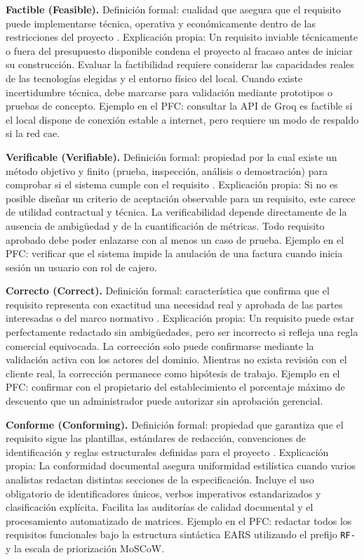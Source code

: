 \documentclass[onecolumn,12pt,a4paper]{IEEEtran}
\begin{document}
	\textbf{Factible (Feasible).} Definici\'on formal: cualidad que asegura que el requisito puede implementarse t\'ecnica, operativa y econ\'omicamente dentro de las restricciones del proyecto \cite{iso29148,ireb2023}. Explicaci\'on propia: Un requisito inviable t\'ecnicamente o fuera del presupuesto disponible condena el proyecto al fracaso antes de iniciar su construcci\'on. Evaluar la factibilidad requiere considerar las capacidades reales de las tecnolog\'ias elegidas y el entorno f\'isico del local. Cuando existe incertidumbre t\'ecnica, debe marcarse para validaci\'on mediante prototipos o pruebas de concepto. Ejemplo en el PFC: consultar la API de Groq es factible si el local dispone de conexi\'on estable a internet, pero requiere un modo de respaldo si la red cae.

	\textbf{Verificable (Verifiable).} Definici\'on formal: propiedad por la cual existe un m\'etodo objetivo y finito (prueba, inspecci\'on, an\'alisis o demostraci\'on) para comprobar si el sistema cumple con el requisito \cite{iso29148,pohl2025,swebok4}. Explicaci\'on propia: Si no es posible dise\~nar un criterio de aceptaci\'on observable para un requisito, este carece de utilidad contractual y t\'ecnica. La verificabilidad depende directamente de la ausencia de ambig\"uedad y de la cuantificaci\'on de m\'etricas. Todo requisito aprobado debe poder enlazarse con al menos un caso de prueba. Ejemplo en el PFC: verificar que el sistema impide la anulaci\'on de una factura cuando inicia sesi\'on un usuario con rol de cajero.

	\textbf{Correcto (Correct).} Definici\'on formal: caracter\'istica que confirma que el requisito representa con exactitud una necesidad real y aprobada de las partes interesadas o del marco normativo \cite{iso29148,pohl2025}. Explicaci\'on propia: Un requisito puede estar perfectamente redactado sin ambig\"uedades, pero ser incorrecto si refleja una regla comercial equivocada. La correcci\'on solo puede confirmarse mediante la validaci\'on activa con los actores del dominio. Mientras no exista revisi\'on con el cliente real, la correcci\'on permanece como hip\'otesis de trabajo. Ejemplo en el PFC: confirmar con el propietario del establecimiento el porcentaje m\'aximo de descuento que un administrador puede autorizar sin aprobaci\'on gerencial.

	\textbf{Conforme (Conforming).} Definici\'on formal: propiedad que garantiza que el requisito sigue las plantillas, est\'andares de redacci\'on, convenciones de identificaci\'on y reglas estructurales definidas para el proyecto \cite{iso29148}. Explicaci\'on propia: La conformidad documental asegura uniformidad estil\'istica cuando varios analistas redactan distintas secciones de la especificaci\'on. Incluye el uso obligatorio de identificadores \'unicos, verbos imperativos estandarizados y clasificaci\'on expl\'icita. Facilita las auditor\'ias de calidad documental y el procesamiento automatizado de matrices. Ejemplo en el PFC: redactar todos los requisitos funcionales bajo la estructura sint\'actica EARS utilizando el prefijo \texttt{RF-} y la escala de priorizaci\'on MoSCoW.
\end{document}
